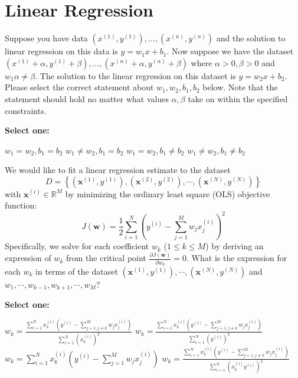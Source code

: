 \documentclass[11pt,addpoints,answers]{exam}
\numberwithin{equation}{section} %
\numberwithin{figure}{section} %
\numberwithin{table}{section} %
\newcommand{\wv}{\mathbf{w}}
\newcommand{\xv}{\mathbf{x}}
\begin{document}
\section{Linear Regression}
\begin{questions}

    \question[4] Suppose you have data ${(x^{(1)}, y^{(1)}), \ldots, (x^{(n)}, y^{(n)})}$ and the solution to linear regression on this data is $y = w_1 x + b_1$. Now suppose we have the dataset \\
    ${(x^{(1)} + \alpha, y^{(1)} + \beta), \ldots, (x^{(n)} + \alpha, y^{(n)} + \beta)}$ where $\alpha > 0, \beta > 0$ and $w_1 \alpha \neq \beta$. The solution to the linear regression on this dataset is $y = w_2 x + b_2$. Please select the correct statement about $w_1, w_2, b_1, b_2$ below. Note that the statement should hold no matter what values $\alpha, \beta$ take on within the specified constraints.
    
    \textbf{Select one:}
    \begin{checkboxes}
        \choice $w_1 = w_2, b_1 = b_2$
        \choice $w_1 \neq w_2, b_1 = b_2$
        \CorrectChoice $w_1 = w_2, b_1 \neq b_2$
        \choice $w_1 \neq w_2, b_1 \neq b_2$
    \end{checkboxes}
    

    \question[4] We would like to fit a linear regression estimate to the dataset 
    $$
    D = \left\{\left(\xv^{(1)},y^{(1)}\right), \left(\xv^{(2)},y^{(2)}\right),\cdots, \left(\xv^{(N)},y^{(N)}\right)\right\}
    $$ with $\xv^{(i)} \in \mathbb{R}^M$ by minimizing the ordinary least square (OLS) objective function:
    $$
    J(\wv) = \frac{1}{2}\sum_{i=1}^N\left(y^{(i)} - \sum_{j=1}^M w_j x_j^{(i)}\right)^2
    $$
    Specifically, we solve for each coefficient $w_k$ ($1\leq k\leq M$) by deriving an expression of $w_k$ from the critical point $\frac{\partial J(\wv)}{\partial w_k} = 0$. What is the expression for each $w_k$ in terms of the dataset 
    $(\xv^{(1)},y^{(1)}), \cdots, (\xv^{(N)},y^{(N)})$ and $w_1,\cdots,w_{k-1},w_{k+1},\cdots,w_M$?

    \textbf{Select one:}
    \begin{checkboxes}
        \choice $w_k = \frac{\sum_{i=1}^N x_k^{(i)}(y^{(i)}-\sum_{j=1,j\neq k}^M w_j x_j^{(i)})}{\sum_{i=1}^N (x_k^{(i)})^2}$
        \CorrectChoice $w_k = \frac{\sum_{i=1}^N x_k^{(i)}(y^{(i)}-\sum_{j=1,j\neq k}^M w_j x_j^{(i)})}{\sum_{i=1}^N (y^{(i)})^2}$
        \choice $w_k = \sum_{i=1}^N x_k^{(i)}(y^{(i)}-\sum_{j=1}^M w_j x_j^{(i)})$
        \choice $w_k = \frac{\sum_{i=1}^N x_k^{(i)}(y^{(i)}-\sum_{j=1,j\neq k}^M w_j x_j^{(i)})}{\sum_{i=1}^N (x_k^{(i)} y^{(i)})^2}$
    \end{checkboxes}


\end{questions}
\end{document}
